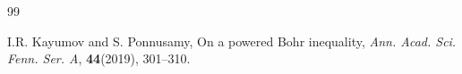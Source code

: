 \documentclass[a4paper,12pt]{amsart}
\theoremstyle{definition}
\begin{document}
\begin{thebibliography}{99}
	
	
	
	
	 {\sc I.R. Kayumov} and {\sc S. Ponnusamy}, On a powered Bohr inequality, \textit{Ann. Acad. Sci. Fenn. Ser. A}, \textbf{44}(2019), 301--310.
	
	
	
	
	
	
	
	

\end{thebibliography}
\end{document}
